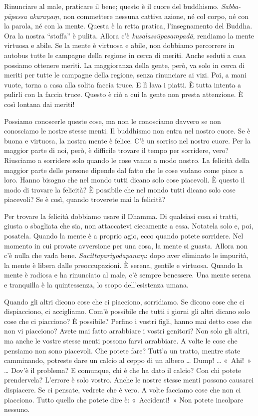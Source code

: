 Rinunciare al male, praticare il bene; questo è il cuore del buddhismo.
\emph{Sabba-pāpassa akaraṇaṃ}, non commettere nessuna cattiva azione, né
col corpo, né con la parola, né con la mente. Questa è la retta pratica,
l'insegnamento del Buddha. Ora la nostra ``stoffa'' è pulita. Allora c'è
\emph{kusalassūpasampadā}, rendiamo la mente virtuosa e abile. Se la
mente è virtuosa e abile, non dobbiamo percorrere in autobus tutte le
campagne della regione in cerca di meriti. Anche seduti a casa possiamo
ottenere meriti. La maggioranza della gente, però, va solo in cerca di
meriti per tutte le campagne della regione, senza rinunciare ai vizi.
Poi, a mani vuote, torna a casa alla solita faccia truce. E lì lava i
piatti. È tutta intenta a pulirli con la faccia truce. Questo è ciò a
cui la gente non presta attenzione. È così lontana dai meriti!

Possiamo conoscerle queste cose, ma non le conosciamo davvero se non
conosciamo le nostre stesse menti. Il buddhismo non entra nel nostro
cuore. Se è buona e virtuosa, la nostra mente è felice. C'è un sorriso
nel nostro cuore. Per la maggior parte di noi, però, è difficile trovare
il tempo per sorridere, vero? Riusciamo a sorridere solo quando le cose
vanno a modo nostro. La felicità della maggior parte delle persone
dipende dal fatto che le cose vadano come piace a loro. Hanno bisogno
che nel mondo tutti dicano solo cose piacevoli. È questo il modo di
trovare la felicità? È possibile che nel mondo tutti dicano solo cose
piacevoli? Se è così, quando troverete mai la felicità?

Per trovare la felicità dobbiamo usare il Dhamma. Di qualsiasi cosa si
tratti, giusta o sbagliata che sia, non attaccatevi ciecamente a essa.
Notatela solo e, poi, posatela. Quando la mente è a proprio agio, ecco
quando potete sorridere. Nel momento in cui provate avversione per una
cosa, la mente si guasta. Allora non c'è nulla che vada bene.
\emph{Sacittapariyodapanaṃ}: dopo aver eliminato le impurità, la mente è
libera dalle preoccupazioni. È serena, gentile e virtuosa. Quando la
mente è radiosa e ha rinunciato al male, c'è sempre benessere. Una mente
serena e tranquilla è la quintessenza, lo scopo dell'esistenza umana.

Quando gli altri dicono cose che ci piacciono, sorridiamo. Se dicono
cose che ci dispiacciono, ci accigliamo. Com'è possibile che tutti i
giorni gli altri dicano solo cose che ci piacciono? È possibile? Perfino
i vostri figli, hanno mai detto cose che non vi piacciono? Avete mai
fatto arrabbiare i vostri genitori? Non solo gli altri, ma anche le
vostre stesse menti possono farvi arrabbiare. A volte le cose che
pensiamo non sono piacevoli. Che potete fare? Tutt'a un tratto, mentre
state camminando, potreste dare un calcio al ceppo di un albero \ldots{}
Dump! \ldots{} «~Ahi!~» \ldots{} Dov'è il problema? E comunque, chi è che ha dato
il calcio? Con chi potete prendervela? L'errore è solo vostro. Anche le
nostre stesse menti possono causarci dispiacere. Se ci pensate, vedrete
che è vero. A volte facciamo cose che non ci piacciono. Tutto quello che
potete dire è: «~Accidenti!~» Non potete incolpare nessuno.

